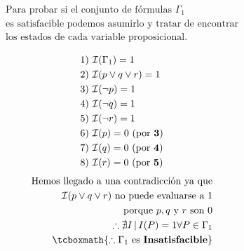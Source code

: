 \documentclass[11pt,letterpaper]{article}
\begin{document}
\begin{enumerate}
\begin{itemize}
                \begin{equation*} \begin{split}
                    \text{Para probar si el conjunto de fórmulas } \Gamma_1 \\
                    \text{es satisfacible podemos asumirlo y tratar de encontrar} \\
                    \text{los estados de cada variable proposicional.} \\
                \end{split} \end{equation*}
                \begin{equation*} \begin{split} \begin{aligned}
                    \text{1) }&\mathcal{I}(\Gamma_1) = 1 \\
                    \text{2) }&\mathcal{I}(p \lor q \lor r) = 1 \\
                    \text{3) }&\mathcal{I}(\neg p) = 1 \\
                    \text{4) }&\mathcal{I}(\neg q) = 1 \\
                    \text{5) }&\mathcal{I}(\neg r) = 1 \\
                    \text{6) }&\mathcal{I}(p) = 0 \text{ (por \textbf{3})} \\
                    \text{7) }&\mathcal{I}(q) = 0 \text{ (por \textbf{4})} \\
                    \text{8) }&\mathcal{I}(r) = 0 \text{ (por \textbf{5})} \\
                \end{aligned} \end{split} \end{equation*}
                \begin{equation*} \begin{split}
                    \text{Hemos llegado a una contradicción ya que} \\
                    \mathcal{I}(p \lor q \lor r) \text{ no puede evaluarse a 1} \\
                    \text{porque } p, q \text{ y } r \text{ son } 0  \\
                    \therefore \nexists I \, | \, I(P) = 1 \forall P \in \Gamma_1 \\
                    \tcboxmath{\therefore \Gamma_1 \text{ es \textbf{Insatisfacible}}}
                \end{split} \end{equation*}


\end{itemize}
\end{enumerate}
\end{document}
